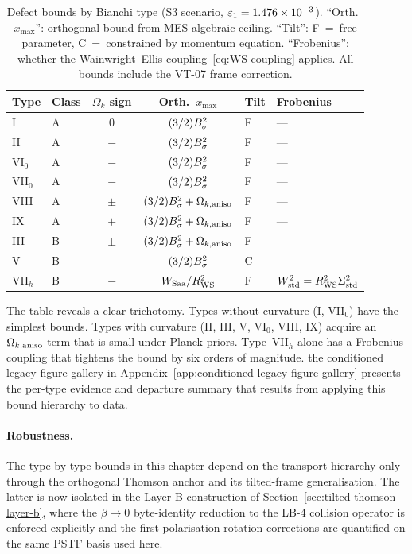 \begin{table}[ht]
\caption{Defect bounds by Bianchi type (S3 scenario,
$\varepsilon_1 = 1.476 \times 10^{-3}$).  ``Orth.\ $x_{\max}$'':
orthogonal bound from MES algebraic ceiling.  ``Tilt'': F~=~free
parameter, C~=~constrained by momentum equation.
``Frobenius'': whether the Wainwright--Ellis
coupling~\eqref{eq:WS-coupling} applies.
All bounds include the VT-07 frame correction.}
\label{tab:type-summary}
\centering\footnotesize\setlength{\tabcolsep}{3.5pt}
\begin{tabular}{llccll}
\toprule
Type & Class & $\Omega_k$ sign
     & Orth.\ $x_{\max}$ & Tilt & Frobenius \\
\midrule
I       & A & $0$  & $(3/2)B_\sigma^2$         & F  & --- \\
II      & A & $-$  & $(3/2)B_\sigma^2$         & F  & --- \\
VI$_0$  & A & $-$  & $(3/2)B_\sigma^2$         & F  & --- \\
VII$_0$ & A & $-$  & $(3/2)B_\sigma^2$         & F  & --- \\
VIII    & A & $\pm$& $(3/2)B_\sigma^2 + \Omega_{k,\mathrm{aniso}}$ & F  & --- \\
IX      & A & $+$  & $(3/2)B_\sigma^2 + \Omega_{k,\mathrm{aniso}}$ & F  & --- \\
\midrule
III     & B & $\pm$& $(3/2)B_\sigma^2 + \Omega_{k,\mathrm{aniso}}$ & F  & --- \\
V       & B & $-$  & $(3/2)B_\sigma^2$             & C  & --- \\
VII$_h$ & B & $-$  & $W_{\mathrm{Saa}}/R_{\rm WS}^2$       & F  &
  $W^2_{\mathrm{std}} = R_{\rm WS}^2\Sigma^2_{\mathrm{std}}$ \\
\bottomrule
\end{tabular}
\end{table}

The table reveals a clear trichotomy.  Types without curvature
(I, VII$_0$) have the simplest bounds.  Types with curvature
(II, III, V, VI$_0$, VIII, IX) acquire an $\Omega_{k,\mathrm{aniso}}$ term
that is small under Planck priors.  Type~VII$_h$ alone has a
Frobenius coupling that tightens the bound by six orders of
magnitude.  the conditioned legacy figure gallery in Appendix~\ref{app:conditioned-legacy-figure-gallery} presents the
per-type evidence and departure summary that results from
applying this bound hierarchy to data.

\paragraph{Robustness.}

The type-by-type bounds in this chapter depend on the transport
hierarchy only through the orthogonal Thomson anchor and its
tilted-frame generalisation.  The latter is now isolated in the
Layer-B construction of Section~\ref{sec:tilted-thomson-layer-b},
where the $\beta \to 0$ byte-identity reduction to the LB-4
collision operator is enforced explicitly and the first
polarisation-rotation corrections are quantified on the same
PSTF basis used here.


